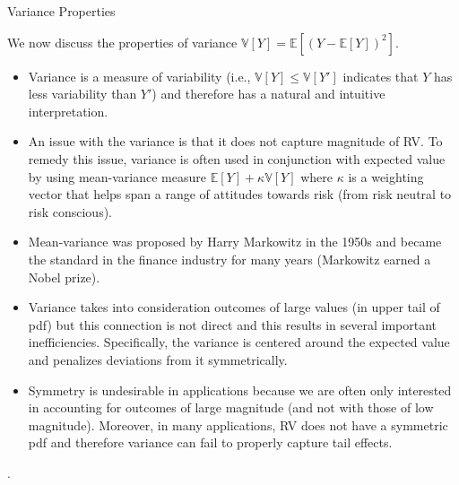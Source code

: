 \documentclass[9pt]{beamer}
\begin{document}
%
\begin{frame}{Variance Properties}


We now discuss the properties of variance $\mathbb{V}[Y]=\mathbb{E}[(Y-\mathbb{E}[Y])^2]$.

\begin{itemize}
\setlength{\itemsep}{10pt}
\item Variance is a measure of variability (i.e., $\mathbb{V}[Y]\leq \mathbb{V}[Y']$ indicates that $Y$ has less variability than $Y'$) and therefore has a natural and intuitive interpretation.  

\item An issue with the variance is that it does not capture magnitude of RV. To remedy this issue, variance is often used in conjunction with expected value by using mean-variance measure $\mathbb{E}[Y]+\kappa\mathbb{V}[Y]$ where $\kappa$ is a weighting vector that helps span a range of attitudes towards risk (from risk neutral to risk conscious). 

\item Mean-variance was proposed by Harry Markowitz in the 1950s and became the standard in the finance industry for many years (Markowitz earned a Nobel prize). 

\item Variance takes into consideration outcomes of large values (in upper tail of pdf) but this connection is not direct and this results in several important inefficiencies.   Specifically, the variance is centered around the expected value and penalizes deviations from it symmetrically. 

\item Symmetry is undesirable in applications because we are often only interested in accounting for outcomes of large magnitude (and not with those of low magnitude).  Moreover, in many applications,  RV does not have a symmetric pdf and therefore variance can fail to properly capture tail effects.  

\end{itemize}
. 


\end{frame}
\end{document}
